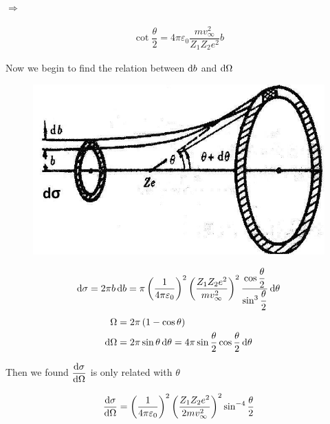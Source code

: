 $\Rightarrow$

\begin{equation}
  \begin{aligned}
    \cot \dfrac{\theta}{2} = 4 \pi \varepsilon_0 \dfrac{m v_{\infty}^2}{Z_1 Z_2 e^2}b  
  \end{aligned}
\end{equation}

Now we begin to find the relation between $\mathop{}\!\mathrm{d} b$ and $\mathop{}\!\mathrm{d} \Omega$

\begin{figure}[H]
  \centering
  \includegraphics[width=0.5\linewidth]{figures/Rutherford-1}
  \label{fig:}
\end{figure}

\begin{equation*}
  \begin{aligned}
    \mathop{}\!\mathrm{d} \sigma = 2 \pi b \mathop{}\!\mathrm{d} b = \pi \left( \dfrac{1}{4 \pi \varepsilon_0}  \right)^2 \left( \dfrac{Z_1 Z_2 e^2}{m v_{\infty}^2}  \right)^2 \dfrac{\cos \dfrac{\theta}{2} }{\sin^3 \dfrac{\theta}{2} } \mathop{}\!\mathrm{d} \theta 
  \end{aligned}
\end{equation*}
\begin{equation*}
  \begin{aligned}
    \Omega &= 2 \pi \left( 1 - \cos \theta \right) \\
    \mathop{}\!\mathrm{d} \Omega &= 2 \pi \sin \theta \mathop{}\!\mathrm{d} \theta = 4 \pi \sin \dfrac{\theta}{2} \cos \dfrac{\theta}{2} \mathop{}\!\mathrm{d} \theta  
  \end{aligned}
\end{equation*}

Then we found $\dfrac{\mathop{}\!\mathrm{d} \sigma}{\mathop{}\!\mathrm{d} \Omega}$ is only related with $\theta$

\begin{equation}
  \begin{aligned}
    \dfrac{\mathop{}\!\mathrm{d} \sigma}{\mathop{}\!\mathrm{d} \Omega} = \left( \dfrac{1}{4 \pi \varepsilon_0}  \right)^2 \left( \dfrac{Z_1 Z_2 e^2}{2 m v_{\infty}^2}  \right)^2 \sin^{-4} \dfrac{\theta}{2}
  \end{aligned}
\end{equation}

